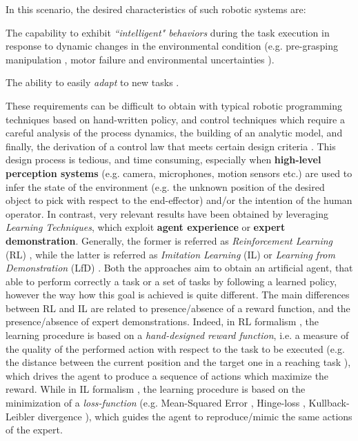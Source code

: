 In this scenario, the desired characteristics of such robotic systems are:\begin{enumerate*}[label=\textbf{(\alph*)}]
    \item The capability to exhibit \textit{``intelligent" behaviors} during the task execution in response to dynamic changes in the environmental condition (e.g. pre-grasping manipulation \cite{kalashnikov2018qt_opt}, motor failure and environmental uncertainties \cite{anne2021meta_learning_fast_adaptive}).
    \item The ability to easily \textit{adapt} to new tasks \cite{jang2022bc_z}. 
\end{enumerate*}
\newline These requirements can be difficult to obtain with typical robotic programming techniques based on hand-written policy, and control techniques which require a careful analysis of the process dynamics, the building of an analytic model, and finally, the derivation of a control law that meets certain design criteria \cite{hafner2011reinforcement_in_feedback_controll}. This design process is tedious, and time consuming, especially when \textbf{high-level perception systems} (e.g. camera, microphones, motion sensors etc.) are used to infer the state of the environment (e.g. the unknown position of the desired object to pick with respect to the end-effector) and/or the intention of the human operator.
\newline In contrast, very relevant results have been obtained by leveraging \textit{Learning Techniques}, which exploit \textbf{agent experience} or \textbf{expert demonstration}. Generally, the former is referred as \textit{Reinforcement Learning} (RL) \cite{sutton2018reinforcement}, while the latter is referred as \textit{Imitation Learning} (IL) or \textit{Learning from Demonstration} (LfD) \cite{argall2009robot_learning_from_demonstration}. Both the approaches aim to obtain an artificial agent, that able to perform correctly a task or a set of tasks by following a learned policy, however the way how this goal is achieved is quite different. The main differences between RL and IL are related to presence/absence of a reward function, and the presence/absence of expert demonstrations. 
\newline Indeed, in RL formalism \cite{kaelbling1996reinforcement_survey}, the learning procedure is based on a \textit{hand-designed reward function}, i.e. a measure of the quality of the performed action with respect to the task to be executed (e.g. the distance between the current position and the target one in a reaching task \cite{}), which drives the agent to produce a sequence of actions which maximize the reward. While in IL formalism \cite{osa2018algorithmic}, the learning procedure is based on the minimization of a \textit{loss-function} (e.g. Mean-Squared Error \cite{james2013introduction_to_sl}, Hinge-loss \cite{cortes1995support}, Kullback-Leibler divergence \cite{kullback1951information}), which guides the agent to reproduce/mimic the same actions of the expert.
